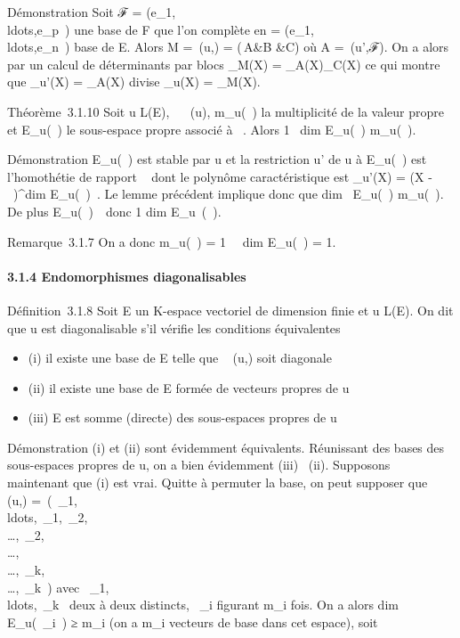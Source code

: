 \documentclass[]{article}
\begin{document}
Démonstration Soit ℱ =
(e\_1,\\ldots,e\_p~)
une base de F que l'on complète en  =
(e\_1,\\ldots,e\_n~)
base de E. Alors M =\
\mathrmMat (u,) = \left
(\matrix\,A&B
&C\right ) où A =\
\mathrmMat (u',ℱ). On a alors par un calcul de
déterminants par blocs \chi\_M(X) = \chi\_A(X)\chi\_C(X)
ce qui montre que \chi\_u'(X) = \chi\_A(X) divise
\chi\_u(X) = \chi\_M(X).

Théorème~3.1.10 Soit u \in L(E), \lambda~
\in{}~(u),
m\_u(\lambda~) la multiplicité de la valeur propre \lambda~ et E\_u(\lambda~)
le sous-espace propre associé à \lambda~. Alors 1 \leq\
dim E\_u(\lambda~) \leq m\_u(\lambda~).

Démonstration E\_u(\lambda~) est stable par u et la restriction u' de u
à E\_u(\lambda~) est l'homothétie de rapport \lambda~ dont le polynôme
caractéristique est \chi\_u'(X) = (X -
\lambda~)^dim E\_u(\lambda~)~. Le lemme
précédent implique donc que dim~
E\_u(\lambda~) \leq m\_u(\lambda~). De plus
E\_u(\lambda~)\neq~\0\,
donc 1 \leq dim E\_u~(\lambda~).

Remarque~3.1.7 On a donc m\_u(\lambda~) = 1 \rigtharrow~\
dim E\_u(\lambda~) = 1.

\paragraph{3.1.4 Endomorphismes diagonalisables}

Définition~3.1.8 Soit E un K-espace vectoriel de dimension finie et u \in
L(E). On dit que u est diagonalisable s'il vérifie les conditions
équivalentes

\begin{itemize}
\itemsep1pt\parskip0pt\parsep0pt
\item
  (i) il existe une base  de E telle que
  \mathrmMat~ (u,) soit
  diagonale
\item
  (ii) il existe une base \mathcal{E} de E formée de vecteurs propres de u
\item
  (iii) E est somme (directe) des sous-espaces propres de u
\end{itemize}

Démonstration (i) et (ii) sont évidemment équivalents. Réunissant des
bases des sous-espaces propres de u, on a bien évidemment (iii) \rigtharrow~(ii).
Supposons maintenant que (i) est vrai. Quitte à permuter la base, on
peut supposer que
\mathrmMat~ (u,\mathcal{E})
=\
\mathrmdiag(\lambda~\_1,\\ldots,\lambda~\_1,\lambda~\_2,\\\ldots,\lambda~\_2,\\\ldots,\\\ldots,\lambda~\_k,\\\ldots,\lambda~\_k~)
avec
\lambda~\_1,\\ldots,\lambda~\_k~
deux à deux distincts, \lambda~\_i figurant m\_i fois. On a
alors dim E\_u(\lambda~\_i~) ≥
m\_i (on a m\_i vecteurs de base dans cet espace), soit
\end{document}
